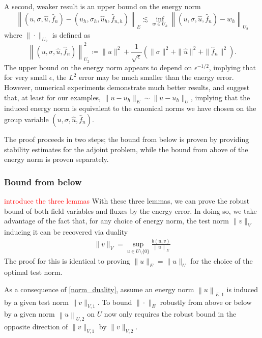 \documentclass[11pt,onecolumn]{scrartcl}
\begin{document}
A second, weaker result is an upper bound on the energy norm
\[
\left\|\left(u,\sigma,\widehat{u},\widehat{f}_n\right)-\left(u_h,\sigma_h,\widehat{u}_h,\widehat{f}_{n,h}\right)\right\|_{E} \lesssim \inf_{w\in U_h}\left\|\left(u,\sigma,\widehat{u},\widehat{f}_n\right)-w_h\right\|_{U_2}
\]
where $\|\cdot \|_{U_2}$ is defined as
\[
\left\|\left(u,\sigma,\widehat{u},\widehat{f}_n\right)\right\|_{U_2}^2 \coloneqq \|u\|^2 + \frac{1}{\sqrt{\epsilon}}\left(\|\sigma\|^2 + \|\widehat{u}\|^2+ \|\widehat{f}_n\|^2\right).
\]
The upper bound on the energy norm appears to depend on $\epsilon^{-1/2}$, implying that for very small $\epsilon$, the $L^2$ error may be much smaller than the energy error. However, numerical experiments demonstrate much better results, and suggest that, at least for our examples, $\|u-u_h\|_E \sim \|u-u_h\|_{U}$, implying that the induced energy norm is equivalent to the canonical norms we have chosen on the group variable $\left(u,\sigma,\widehat{u},\widehat{f}_n\right)$. 

The proof proceeds in two steps; the bound from below is proven by providing stability estimates for the adjoint problem, while the bound from above of the energy norm is proven separately.  

\subsubsection{Bound from below}
\textcolor{red}{introduce the three lemmas}
With these three lemmas, we can prove the robust bound of both field variables and fluxes by the energy error.  In doing so, we take advantage of the fact that, for any choice of energy norm, the test norm $\|v\|_V$ inducing it can be recovered via duality
\begin{align}
\| v \|_V = \sup_{u \in U\setminus \{0\}} \frac{b\left(u,v\right)}{\left\| u \right\|_E} \label{norm_duality}
\end{align}
The proof for this is identical to proving $\|u\|_E = \|u\|_U$ for the choice of the optimal test norm.  

As a consequence of \eqref{norm_duality}, assume an energy norm $\left\| u \right\|_{E,1}$ is induced by a given test norm $\| v  \|_{V,1}$.  To bound $\|\cdot\|_E$ robustly from above or below by a given norm $\left\| u \right\|_{U,2}$ on $U$ now only requires the robust bound in the opposite direction of $\| v \|_{V,1}$ by $\|v\|_{V,2}$. 
\end{document}
